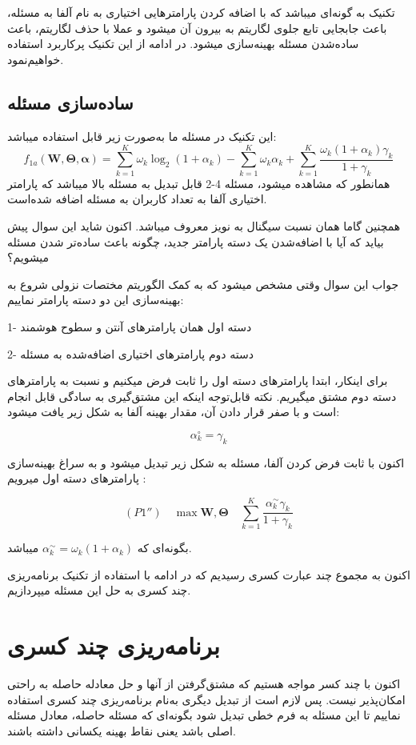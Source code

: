 تکنیک به گونه‌ای میباشد که با اضافه کردن پارامترهایی اختیاری به نام آلفا به مسئله، باعث جابجایی تابع جلوی لگاریتم به بیرون آن میشود و عملا با حذف لگاریتم، باعث ساده‌شدن مسئله بهینه‌سازی میشود. در ادامه از این تکنیک پرکاربرد استفاده خواهیم‌نمود.
\subsection{ساده‌سازی مسئله}
این تکنیک در مسئله ما به‌صورت زیر قابل استفاده میباشد:
\[
f_{1a}(\mathbf{W}, \boldsymbol{\Theta}, \boldsymbol{\alpha}) = \sum_{k=1}^{K} \omega_k \log_2(1 + \alpha_k) - \sum_{k=1}^{K} \omega_k \alpha_k + \sum_{k=1}^{K} \frac{\omega_k (1 + \alpha_k) \gamma_k}{1 + \gamma_k}
\]
همانطور که مشاهده میشود، مسئله 4-2 قابل تبدیل به مسئله بالا میباشد که پارامتر اختیاری آلفا به تعداد کاربران به مسئله اضافه شده‌است.

همچنین گاما همان نسبت سیگنال به نویز معروف میباشد.
اکنون شاید این سوال پیش بیاید که آیا با اضافه‌شدن یک دسته پارامتر جدید، چگونه باعث ساده‌تر شدن مسئله میشویم؟

جواب این سوال وقتی مشخص میشود که به کمک الگوریتم مختصات نزولی شروع به بهینه‌سازی این دو دسته پارامتر نماییم:

1- دسته اول همان پارامترهای آنتن و سطوح هوشمند

2- دسته دوم پارامترهای اختیاری اضافه‌شده به مسئله

برای اینکار، ابتدا پارامترهای دسته اول را ثابت فرض میکنیم و نسبت به پارامترهای دسته دوم مشتق میگیریم.
نکته قابل‌توجه اینکه این مشتق‌گیری به سادگی قابل انجام است و با صفر قرار دادن آن، مقدار بهینه آلفا به شکل زیر یافت میشود:

 \[\alpha_k^\circ = \gamma_k\]

 اکنون با ثابت فرض کردن آلفا، مسئله به شکل زیر تبدیل میشود و به سراغ بهینه‌سازی پارامترهای دسته اول میرویم :
 
 \[
 (P1'') \quad \max \mathbf{W}, \boldsymbol{\Theta} \quad \sum_{k=1}^{K} \frac{\alpha_k^\sim \gamma_k}{1 + \gamma_k}
 \]
 
 بگونه‌ای که $\alpha_k^\sim = \omega_k(1 + \alpha_k)$ میباشد.
 
 اکنون به مجموع چند عبارت کسری رسیدیم که در ادامه با استفاده از تکنیک برنامه‌ریزی چند کسری به حل این مسئله میپردازیم.
\section{برنامه‌ریزی چند کسری}
\cite{12}
اکنون با چند کسر مواجه هستیم که مشتق‌گرفتن از آنها و حل معادله حاصله به راحتی امکان‌پذیر نیست. پس لازم است از تبدیل دیگری به‌نام برنامه‌ریزی چند کسری استفاده نماییم تا این مسئله به فرم خطی تبدیل شود بگونه‌ای که مسئله حاصله، معادل مسئله اصلی باشد یعنی نقاط بهینه یکسانی داشته باشند. 

